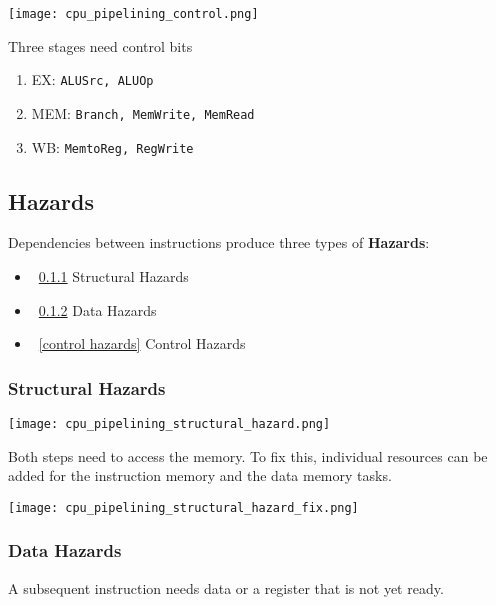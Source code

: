 \begin{center}
    \texttt{[image: cpu\_pipelining\_control.png]}
\end{center}

Three stages need control bits
\begin{enumerate}
    \item EX: \texttt{ALUSrc, ALUOp}
    \item MEM: \texttt{Branch, MemWrite, MemRead}
    \item WB: \texttt{MemtoReg, RegWrite}
\end{enumerate}

\subsection{Hazards}
Dependencies between instructions produce three types of \textbf{Hazards}:
\begin{itemize}
    \item~\ref{structural hazards} Structural Hazards
    \item~\ref{data hazards} Data Hazards
    \item~\ref{control hazards} Control Hazards
\end{itemize}

\subsubsection{Structural Hazards}\label{structural hazards}

\texttt{[image: cpu\_pipelining\_structural\_hazard.png]}

Both steps need to access the memory. To fix this, individual resources can be added for the instruction memory and the data memory tasks.

\begin{center}
    \texttt{[image: cpu\_pipelining\_structural\_hazard\_fix.png]}
\end{center}

\subsubsection{Data Hazards}\label{data hazards}

A subsequent instruction needs data or a register that is not yet ready.

